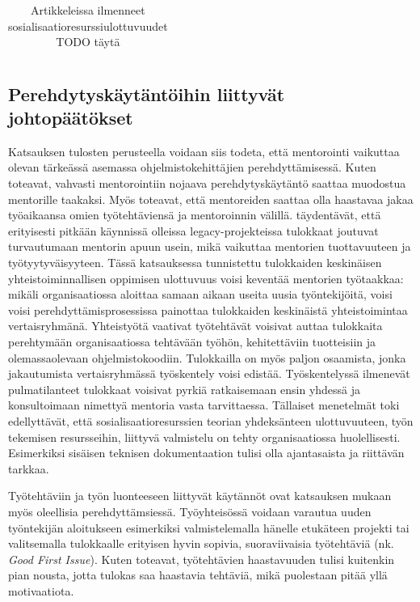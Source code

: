 \documentclass[utf8]{gradu3}
\begin{document}
\begin{table}[h]
\begin{tabular}{llllllllllllllll}
\end{tabular}
\caption{Artikkeleissa ilmenneet sosialisaatioresurssiulottuvuudet TODO täytä}
\label{tbl:ulottuvuusmatriisi}
\end{table}

\subsection{Perehdytyskäytäntöihin liittyvät johtopäätökset}

Katsauksen tulosten perusteella voidaan siis todeta, että mentorointi vaikuttaa olevan tärkeässä asemassa ohjelmistokehittäjien perehdyttämisessä. Kuten \textcite{viviani-murphy-2019} toteavat, vahvasti mentorointiin nojaava perehdytyskäytäntö saattaa muodostua mentorille taakaksi. Myös \textcite{moe-ym-2020} toteavat, että mentoreiden saattaa olla haastavaa jakaa työaikaansa omien työtehtäviensä ja mentoroinnin välillä. \textcite{britto-ym-2017} täydentävät, että erityisesti pitkään käynnissä olleissa legacy-projekteissa tulokkaat joutuvat turvautumaan mentorin apuun usein, mikä vaikuttaa mentorien tuottavuuteen ja työtyytyväisyyteen. Tässä katsauksessa tunnistettu tulokkaiden keskinäisen yhteistoiminnallisen oppimisen ulottuvuus voisi keventää mentorien työtaakkaa: mikäli organisaatiossa aloittaa samaan aikaan useita uusia työntekijöitä, voisi voisi perehdyttämisprosessissa painottaa tulokkaiden keskinäistä yhteistoimintaa vertaisryhmänä. Yhteistyötä vaativat työtehtävät voisivat auttaa tulokkaita perehtymään organisaatiossa tehtävään työhön, kehitettäviin tuotteisiin ja olemassaolevaan ohjelmistokoodiin. Tulokkailla on myös paljon osaamista, jonka jakautumista vertaisryhmässä työskentely voisi edistää. Työskentelyssä ilmenevät pulmatilanteet tulokkaat voisivat pyrkiä ratkaisemaan ensin yhdessä ja konsultoimaan nimettyä mentoria vasta tarvittaessa. Tällaiset menetelmät toki edellyttävät, että sosialisaatioresurssien teorian yhdeksänteen ulottuvuuteen, työn tekemisen resursseihin, liittyvä valmistelu on tehty organisaatiossa huolellisesti. Esimerkiksi sisäisen teknisen dokumentaation tulisi olla ajantasaista ja riittävän tarkkaa.

Työtehtäviin ja työn luonteeseen liittyvät käytännöt ovat katsauksen mukaan myös oleellisia perehdyttämsiessä. Työyhteisössä voidaan varautua uuden työntekijän aloitukseen esimerkiksi valmistelemalla hänelle etukäteen projekti tai valitsemalla tulokkaalle erityisen hyvin sopivia, suoraviivaisia työtehtäviä (nk. \textit{Good First Issue}). Kuten \textcite{ju-ym-2021} toteavat, työtehtävien haastavuuden tulisi kuitenkin pian nousta, jotta tulokas saa haastavia tehtäviä, mikä puolestaan pitää yllä motivaatiota.
\end{document}
